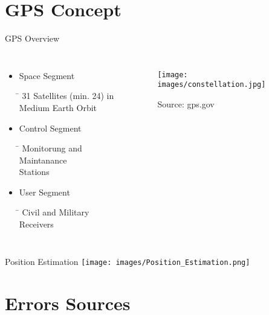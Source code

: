 \documentclass[12pt, compress, xcolor=table]{beamer}
\begin{document}
\section{GPS Concept}

\begin{frame}{GPS Overview}
  \begin{columns}

    \begin{itemize}
    
      \item Space Segment
      \begin{tabbing}
      \hspace*{0.5cm}\= \kill
      \> \footnotesize{31 Satellites (min. 24) in} \\
      \> \footnotesize{Medium Earth Orbit} \\
      \end{tabbing}

      \item Control Segment
      \begin{tabbing}
      \hspace*{0.5cm}\= \kill
      \> \footnotesize{Monitorung and Maintanance} \\
      \> \footnotesize{Stations} \\
      \end{tabbing}
      
      \item User Segment
      \begin{tabbing}
      \hspace*{0.5cm}\= \kill
      \> \footnotesize{Civil and Military Receivers}
      \end{tabbing}
      
    \end{itemize}
 
    \begin{figure}
     \texttt{[image: images/constellation.jpg]}
    \caption*{Source: gps.gov}
    \end{figure}
  \end{columns}
\end{frame}

\begin{frame}{Position Estimation}
 \texttt{[image: images/Position\_Estimation.png]}
\end{frame}


\section{Errors Sources}
\end{document}
